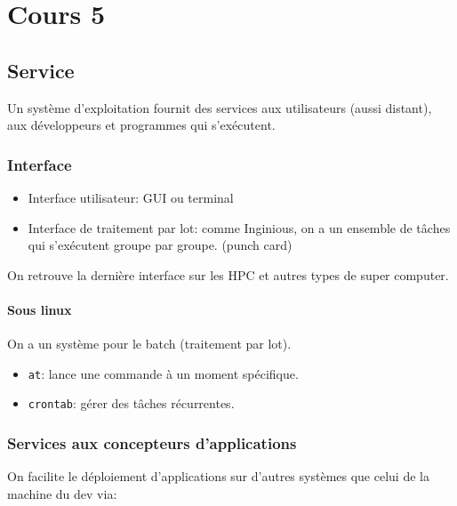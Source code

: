 \section{Cours 5}\label{cours-5}

\subsection{Service}\label{service}

Un système d'exploitation fournit des services aux utilisateurs (aussi
distant), aux développeurs et programmes qui s'exécutent.

\subsubsection{Interface}\label{interface}

\begin{itemize}
\tightlist
\item
  Interface utilisateur: GUI ou terminal
\item
  Interface de traitement par lot: comme Inginious, on a un ensemble de
  tâches qui s'exécutent groupe par groupe. (punch card)
\end{itemize}

On retrouve la dernière interface sur les HPC et autres types de super
computer.

\paragraph{Sous linux}\label{sous-linux}

On a un système pour le batch (traitement par lot).

\begin{itemize}
\tightlist
\item
  \texttt{at}: lance une commande à un moment spécifique.
\item
  \texttt{crontab}: gérer des tâches récurrentes.
\end{itemize}

\subsubsection{Services aux concepteurs
d'applications}\label{services-aux-concepteurs-dapplications}

On facilite le déploiement d'applications sur d'autres systèmes que
celui de la machine du dev via:

